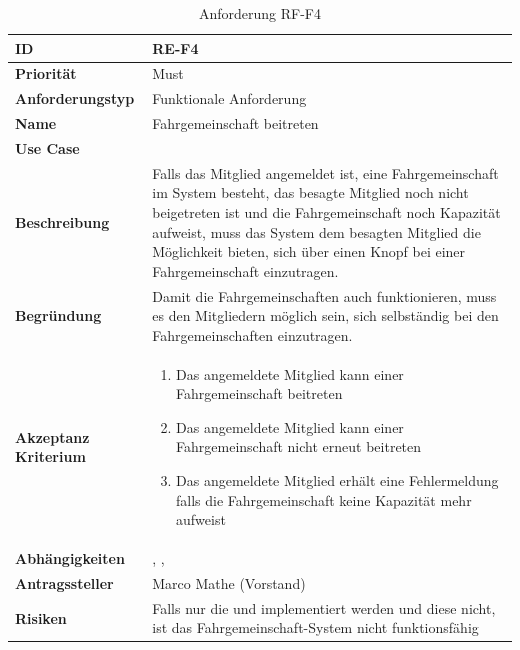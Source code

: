 \begin{table}[ht]
\centering
  \begin{tabular}{ l | p{8cm} }
	\hline
	\rowcolor{gray}
	\textbf{ID} 			&	\textbf{RE-F4}\\ \hline
	\textbf{Priorität} 		&	Must\\ \hline
	\textbf{Anforderungstyp}	&	Funktionale Anforderung\\ \hline
	\textbf{Name} 			&	Fahrgemeinschaft beitreten\\ \hline
	\textbf{Use Case} 		&	\nameref{table:use_case_3}\\ \hline
	\textbf{Beschreibung} 	&	Falls das Mitglied angemeldet ist, eine Fahrgemeinschaft im System besteht, das besagte Mitglied noch nicht beigetreten ist und die Fahrgemeinschaft noch Kapazität aufweist, muss das System dem besagten Mitglied die Möglichkeit bieten, sich über einen Knopf bei einer Fahrgemeinschaft einzutragen.\\ \hline
	\textbf{Begründung} 		&	Damit die Fahrgemeinschaften auch funktionieren, muss es den Mitgliedern möglich sein, sich selbständig bei den Fahrgemeinschaften einzutragen.\\ \hline
	\textbf{Akzeptanz Kriterium}	&	\begin{enumerate}
					\item Das angemeldete Mitglied kann einer Fahrgemeinschaft beitreten
					\item Das angemeldete Mitglied kann einer Fahrgemeinschaft nicht erneut beitreten
					\item Das angemeldete Mitglied erhält eine Fehlermeldung falls die Fahrgemeinschaft keine Kapazität mehr aufweist
					\end{enumerate}
					\\ \hline
	\textbf{Abhängigkeiten} 	&	\nameref{table:req_1}, \nameref{table:req_2}, \nameref{table:req_3}\\ \hline
	\textbf{Antragssteller} 	&	Marco Mathe (Vorstand)\\ \hline
	\textbf{Risiken}	 	&	Falls nur die \nameref{table:req_2} und \nameref{table:req_3} implementiert werden und diese nicht, ist das Fahrgemeinschaft-System nicht funktionsfähig
  \end{tabular}
   \caption{Anforderung RF-F4}\label{table:req_4}
\end{table}

